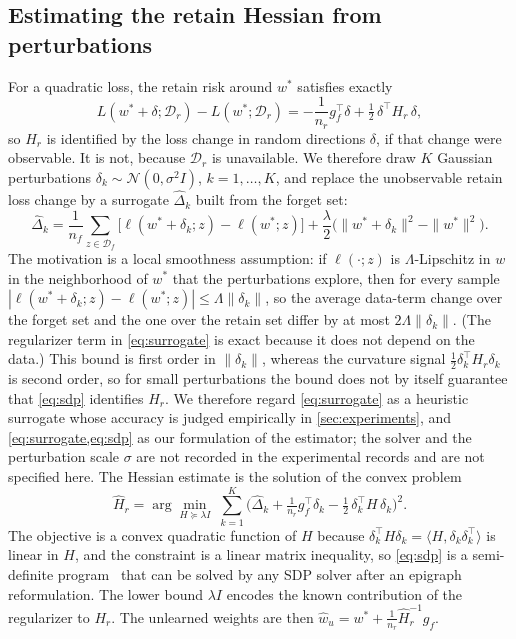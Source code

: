 \documentclass[10pt,twocolumn,letterpaper]{article}
\begin{document}
\subsection{Estimating the retain Hessian from perturbations}
\label{sec:hess}
For a quadratic loss, the retain risk around $w^*$ satisfies exactly
\begin{equation}
  L(w^*\!+\!\delta;\mathcal D_r)-L(w^*;\mathcal D_r)=-\frac{1}{n_r}g_f^\top\delta+\tfrac12\,\delta^\top H_r\,\delta,
  \label{eq:quad}
\end{equation}
so $H_r$ is identified by the loss change in random directions $\delta$, if that change were observable. It is not, because $\mathcal D_r$ is unavailable. We therefore draw $K$ Gaussian perturbations $\delta_k\sim\mathcal N(0,\sigma^2 I)$, $k=1,\dots,K$, and replace the unobservable retain loss change by a surrogate $\hat\Delta_k$ built from the forget set:
\begin{equation}
  \hat\Delta_k=\frac1{n_f}\sum_{z\in\mathcal D_f}\big[\ell(w^*\!+\!\delta_k;z)-\ell(w^*;z)\big]+\frac\lambda2\big(\|w^*\!+\!\delta_k\|^2-\|w^*\|^2\big).
  \label{eq:surrogate}
\end{equation}
The motivation is a local smoothness assumption: if $\ell(\cdot;z)$ is $\Lambda$-Lipschitz in $w$ in the neighborhood of $w^*$ that the perturbations explore, then for every sample $|\ell(w^*\!+\!\delta_k;z)-\ell(w^*;z)|\le\Lambda\|\delta_k\|$, so the average data-term change over the forget set and the one over the retain set differ by at most $2\Lambda\|\delta_k\|$. (The regularizer term in \cref{eq:surrogate} is exact because it does not depend on the data.) This bound is first order in $\|\delta_k\|$, whereas the curvature signal $\frac12\delta_k^\top H_r\delta_k$ is second order, so for small perturbations the bound does not by itself guarantee that \cref{eq:sdp} identifies $H_r$. We therefore regard \cref{eq:surrogate} as a heuristic surrogate whose accuracy is judged empirically in \cref{sec:experiments}, and \cref{eq:surrogate,eq:sdp} as our formulation of the estimator; the solver and the perturbation scale $\sigma$ are not recorded in the experimental records and are not specified here. The Hessian estimate is the solution of the convex problem
\begin{equation}
  \widehat H_r=\arg\min_{H\succeq\lambda I}\;\sum_{k=1}^{K}\Big(\hat\Delta_k+\tfrac1{n_r}g_f^\top\delta_k-\tfrac12\,\delta_k^\top H\,\delta_k\Big)^2 .
  \label{eq:sdp}
\end{equation}
The objective is a convex quadratic function of $H$ because $\delta_k^\top H\delta_k=\langle H,\delta_k\delta_k^\top\rangle$ is linear in $H$, and the constraint is a linear matrix inequality, so \cref{eq:sdp} is a semi-definite program~\cite{boyd2004convex} that can be solved by any SDP solver after an epigraph reformulation. The lower bound $\lambda I$ encodes the known contribution of the regularizer to $H_r$. The unlearned weights are then $\hat w_u=w^*+\frac1{n_r}\widehat H_r^{-1}g_f$.
\end{document}
